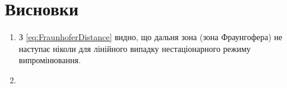 \chapter*{Висновки}

\begin{enumerate}
%
\item З \eqref{eq:FraunhoferDistance} видно, що дальня зона (зона Фраунгофера) не 
наступає ніколи для лінійного випадку нестаціонарного режиму випромінювання.
%
\item 
%
\end{enumerate}
%

